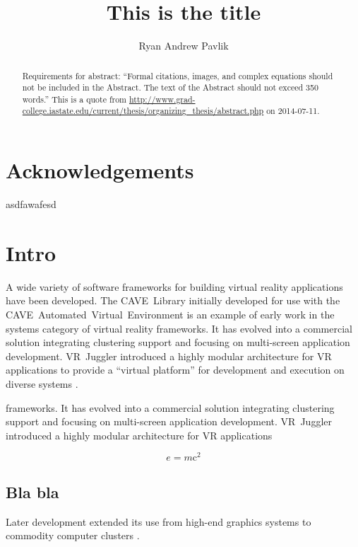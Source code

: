 \documentclass[capstoc,capschap,draftcls]{rpisudiss}
\title{This is the title}
\author{Ryan Andrew Pavlik}
\begin{document}
\maketitle %

\tableofcontents
\listoffigures
\listoftables
\begin{abstract}
 Requirements for abstract:
 ``Formal citations, images, and complex equations should not be included in the Abstract.
 The text of the Abstract should not exceed 350 words.''
 This is a quote from \url{http://www.grad-college.iastate.edu/current/thesis/organizing_thesis/abstract.php} on 2014-07-11.
\end{abstract}

\chapter{Acknowledgements}
asdfawafesd

\mainmatter %

\chapter{Intro}


A wide variety of software frameworks for building virtual reality
applications have been developed. The CAVE~Library initially developed
for use with the CAVE~Automated~Virtual~Environment \cite{Cruz-Neira1993}
is an example of early work in the systems category of virtual reality
frameworks. It has evolved into a commercial solution integrating
clustering support and focusing on multi-screen application development.
VR~Juggler introduced a highly modular architecture for VR applications
to provide a ``virtual platform'' for development and execution
on diverse systems \cite{Bierbaum2001,Bierbaum2005}.

frameworks. It has evolved into a commercial solution integrating
clustering support and focusing on multi-screen application development.
VR~Juggler introduced a highly modular architecture for VR applications

\[e=m\mathrm{c}^2\]

\section{Bla bla}
Later development
extended its use from high-end graphics systems to commodity computer
clusters \cite{Allard2002,Bierbaum2005}.
\end{document}
